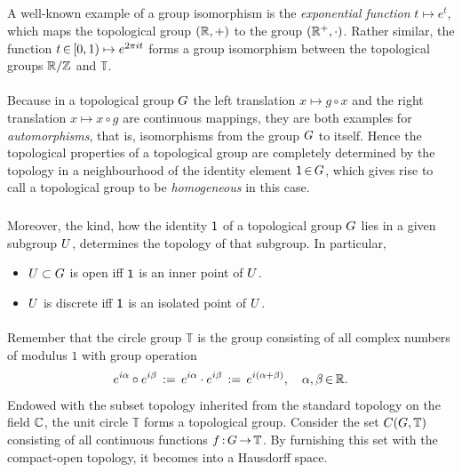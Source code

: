 \documentclass[11pt,twoside]{article}
\begin{document}
\subparagraph{} %
A well-known example of a group isomorphism is
the \textit{exponential function} $t \mapsto e^{t}$,
which maps the topological group $({\mathbb{R}},+)$ to the group $({\mathbb{R}}^+,\cdot)$.
Rather similar,
the function
$t {\,\in\,} [0,1) \mapsto e^{2 \pi it}$
forms a group isomorphism between the topological groups
${\mathbb{R}} / {\mathbb{Z}}$ and $\mathbb{T}$.

\paragraph{} %
Because in a topological group $G$
the left  translation $x \mapsto g \circ x$ and
the right translation $x \mapsto x \circ g$
are continuous mappings,
they are both examples for \textit{automorphisms},
that is,
isomorphisms from the group $G$ to itself.
Hence the topological properties of a topological group
are completely determined by the topology in a neighbourhood
of the identity element ${\mathsf{1}} {\,\in\,} G$,
which gives rise to call a topological group to be \textit{homogeneous}
in this case.

\subparagraph{}
Moreover,
the kind,
how the identity ${\mathsf{1}}$ of a topological group $G$ lies
in a given subgroup $U$,
determines the topology of that subgroup.
In particular,

\begin{itemize}[leftmargin=12pt]
\item[1.]
$U \subset G$ is open iff ${\mathsf{1}}$ is an inner point of $U$.

\item[2.]
$U$ is discrete iff ${\mathsf{1}}$ is an isolated point of $U$.
\end{itemize}

\paragraph{} %
Remember that the {circle group} $\mathbb{T}$ is the group
consisting of all complex numbers of modulus $1$ with group operation
\[
e^{i \alpha} \circ e^{i \beta} \,:=\,
e^{i \alpha} \cdot e^{i \beta} \,:=\,
e^{i(\alpha + \beta)},
\quad \alpha,\beta {\,\in\,} {\mathbb{R}}.
\]
Endowed with the subset topology inherited
from the standard topology on the field ${\mathbb{C}}$,
the unit circle $\mathbb{T}$ forms a topological group.
Consider the set $C(G,\mathbb{T})$ consisting of all
continuous functions $f {\,:\,}G {\,\to\,} \mathbb{T}$.
By furnishing this set with the compact-open topology,
it becomes into a Hausdorff space.
\end{document}

